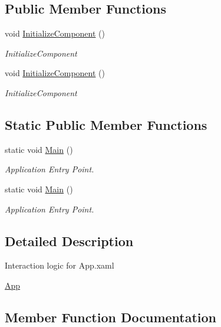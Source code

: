 \subsection*{Public Member Functions}
\begin{DoxyCompactItemize}
\item 
void \hyperlink{class_power_system_planning_wpf_app_1_1_app_abb8be3aedfdf2605dad9e7b85e4db491}{Initialize\+Component} ()
\begin{DoxyCompactList}\small\item\em Initialize\+Component \end{DoxyCompactList}\item 
void \hyperlink{class_power_system_planning_wpf_app_1_1_app_abb8be3aedfdf2605dad9e7b85e4db491}{Initialize\+Component} ()
\begin{DoxyCompactList}\small\item\em Initialize\+Component \end{DoxyCompactList}\end{DoxyCompactItemize}
\subsection*{Static Public Member Functions}
\begin{DoxyCompactItemize}
\item 
static void \hyperlink{class_power_system_planning_wpf_app_1_1_app_aa23fe02d7267383953638c68a677eea8}{Main} ()
\begin{DoxyCompactList}\small\item\em Application Entry Point. \end{DoxyCompactList}\item 
static void \hyperlink{class_power_system_planning_wpf_app_1_1_app_aa23fe02d7267383953638c68a677eea8}{Main} ()
\begin{DoxyCompactList}\small\item\em Application Entry Point. \end{DoxyCompactList}\end{DoxyCompactItemize}


\subsection{Detailed Description}
Interaction logic for App.\+xaml 

\hyperlink{class_power_system_planning_wpf_app_1_1_app}{App} 

\subsection{Member Function Documentation}
